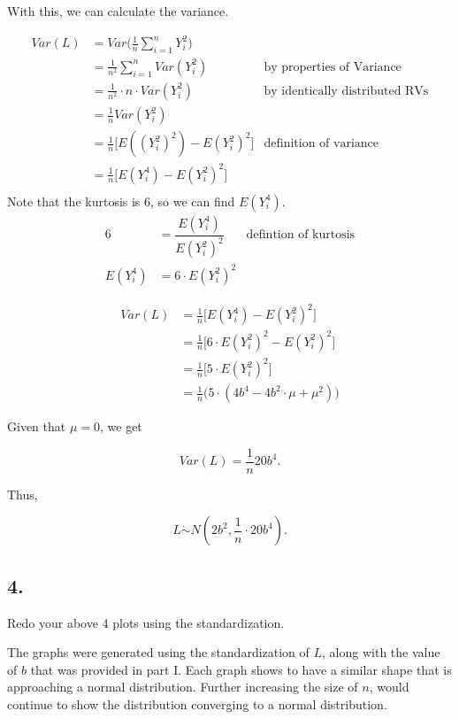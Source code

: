\documentclass[12pt]{article}
\begin{document}
With this, we can calculate the variance.

\begin{align*}
	Var(L)  & = Var \Big( \frac{ 1 }{ n } \sum_{i = 1}^{n} Y_i^2 \Big) \\
		& = \frac{ 1 }{ n^2 } \sum_{i = 1}^{n} Var(  Y_i^2)  & \text{by properties of Variance}\\
		& =  \frac{ 1 }{ n^2 }\cdot  n \cdot Var(  Y_i^2) & \text{by identically distributed RVs}\\
		& = \frac{ 1 }{ n }Var(Y_i^2) \\
		& = \frac{ 1 }{ n } \Big[ E( (Y_i^2)^2) - E(Y_i^2)^2  \Big] & \text{definition of variance} \\
		& = \frac{ 1 }{ n } \Big[ E( Y_i^4) - E(Y_i^2)^2  \Big] \\
\end{align*}
Note that the kurtosis is 6, so we can find  $E(Y_i^4)$.
\begin{align*}
	6 & = \dfrac{E(Y_i^4)}{E(Y_i^2)^2} & \text{defintion of kurtosis} \\
	E(Y_i^4) & = 6 \cdot E(Y_i^2)^2
\end{align*}

\begin{align*}
Var(L) & =  \frac{ 1 }{ n } \Big[ E( Y_i^4) - E(Y_i^2)^2  \Big] \\
	& =  \frac{ 1 }{ n } \Big[ 6 \cdot E(Y_i^2)^2 - E(Y_i^2)^2  \Big] \\
	& =  \frac{ 1 }{ n } \Big[ 5 \cdot E(Y_i^2)^2  \Big] \\
	& = \frac{ 1 }{ n } \Big( 5\cdot (4b^4 - 4b^2\cdot \mu + \mu^2 ) \Big)
\end{align*}

Given that $\mu = 0$, we get

$$Var(L)  = \frac{ 1 }{ n } 20b^4.$$

Thus, 

$$L \dot{\sim} N ( 2b^2, \frac{1}{n}\cdot 20b^4).$$

\subsection{4.}
Redo your above 4 plots using the standardization.

\bigskip
\noindent
The graphs were generated using the standardization of $L$, along with the value of $b$ that was provided in part I. Each graph shows to have a similar shape that is approaching a normal distribution. Further increasing the size of $n$, would continue to show the distribution converging to a normal distribution. 
\end{document}
